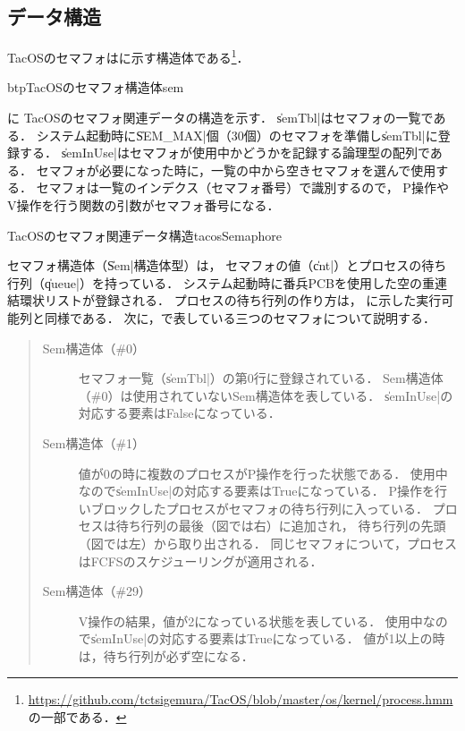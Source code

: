 \subsection{データ構造}
TacOSのセマフォはに示す構造体である\footnote{
\url{https://github.com/tctsigemura/TacOS/blob/master/os/kernel/process.hmm}
の一部である．}．

\begin{myfig}{btp}{TacOSのセマフォ構造体}{sem}

\end{myfig}

に
TacOSのセマフォ関連データの構造を示す．
\|semTbl|はセマフォの一覧である．
システム起動時に\|SEM_MAX|個（30個）のセマフォを準備し\|semTbl|に登録する．
\|semInUse|はセマフォが使用中かどうかを記録する論理型の配列である．
セマフォが必要になった時に，一覧の中から空きセマフォを選んで使用する．
セマフォは一覧のインデクス（セマフォ番号）で識別するので，
P操作やV操作を行う関数の引数がセマフォ番号になる．

{TacOSのセマフォ関連データ構造}{tacosSemaphore}

セマフォ構造体（\|Sem|構造体型）は，
セマフォの値（\|cnt|）とプロセスの待ち行列（\|queue|）を持っている．
システム起動時に番兵PCBを使用した空の重連結環状リストが登録される．
プロセスの待ち行列の作り方は，
に示した実行可能列と同様である．
次に，で表している三つのセマフォについて説明する．

\begin{quote}
\begin{description}
\item [Sem構造体（\#0）]
セマフォ一覧（\|semTbl|）の第0行に登録されている．
Sem構造体（\#0）は使用されていないSem構造体を表している．
\|semInUse|の対応する要素はFalseになっている．

\item [Sem構造体（\#1）]
値が0の時に複数のプロセスがP操作を行った状態である．
使用中なので\|semInUse|の対応する要素はTrueになっている．
P操作を行いブロックしたプロセスがセマフォの待ち行列に入っている．
プロセスは待ち行列の最後（図では右）に追加され，
待ち行列の先頭（図では左）から取り出される．
同じセマフォについて，プロセスはFCFSのスケジューリングが適用される．

\item [Sem構造体（\#29）]
V操作の結果，値が2になっている状態を表している．
使用中なので\|semInUse|の対応する要素はTrueになっている．
値が1以上の時は，待ち行列が必ず空になる．
\end{description}
\end{quote}


